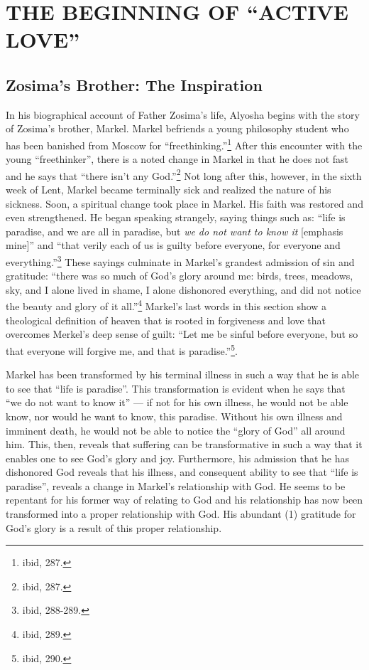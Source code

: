 \chapter{THE BEGINNING OF ``ACTIVE LOVE''}
	\section{Zosima's Brother: The Inspiration}
	In his biographical account of Father Zosima's life, Alyosha begins with the story of Zosima's brother, Markel. Markel befriends a young philosophy student who has been banished from Moscow for ``freethinking.''\footnote{ibid, 287.} After this encounter with the young ``freethinker'', there is a noted change in Markel in that he does not fast and he says that ``there isn't any God.''\footnote{ibid, 287.} Not long after this, however, in the sixth week of Lent, Markel became terminally sick and realized the nature of his sickness. Soon, a spiritual change took place in Markel. His faith was restored and even strengthened. He began speaking strangely, saying things such as: ``life is paradise, and we are all in paradise, but \emph{we do not want to know it} [emphasis mine]'' and ``that verily each of us is guilty before everyone, for everyone and everything.''\footnote{ibid, 288-289.} These sayings culminate in Markel's grandest admission of sin and gratitude: ``there was so much of God's glory around me: birds, trees, meadows, sky, and I alone lived in shame, I alone dishonored everything, and did not notice the beauty and glory of it all.''\footnote{ibid, 289.} Markel's last words in this section show a theological definition of heaven that is rooted in forgiveness and love that overcomes Merkel's deep sense of guilt: ``Let me be sinful before everyone, but so that everyone will forgive me, and that is paradise.''\footnote{ibid, 290.}.
  
  Markel has been transformed by his terminal illness in such a way that he is able to see that ``life is paradise''. This transformation is evident when he says that ``we do not want to know it'' --- if not for his own illness, he would not be able know, nor would he want to know, this paradise. Without his own illness and imminent death, he would not be able to notice the ``glory of God'' all around him. This, then, reveals that suffering can be transformative in such a way that it enables one to see God's glory and joy. Furthermore, his admission that he has dishonored God reveals that his illness, and consequent ability to see that ``life is paradise'', reveals a change in Markel's relationship with God. He seems to be repentant for his former way of relating to God and his relationship has now been transformed into a proper relationship with God. His abundant (1) gratitude for God's glory is a result of this proper relationship.
  
